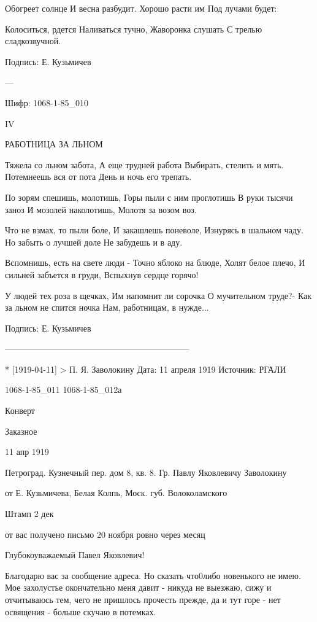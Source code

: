 Обогреет солнце
     И весна разбудит.
Хорошо расти им 
     Под лучами будет:

Колоситься, рдется
     Наливаться тучно,
Жаворонка слушать
     С трелью сладкозвучной.
     
Подпись: Е. Кузьмичев

---

Шифр:   1068-1-85_010

IV



РАБОТНИЦА ЗА ЛЬНОМ


Тяжела со льном забота,
А еще трудней работа
          Выбирать, стелить и мять.
Потемнеешь вся от пота
          День и ночь его трепать.

По зорям спешишь, молотишь,
Горы пыли с ним проглотишь
          В руки тысячи заноз
И мозолей наколотишь,
          Молотя за возом воз.

Что не взмах, то пыли боле,
И закашлешь поневоле,
          Изнурясь в шальном чаду.
Но забыть о лучшей доле
          Не забудешь и в аду.

Вспомнишь, есть на свете люди -   
Точно яблоко на блюде,
          Холят белое плечо,
И сильней забъется в груди,
          Вспыхнув сердце горячо!

У людей тех роза в щечках,
Им напомнит ли сорочка
          О мучительном труде?-
Как за льном не спится ночка
          Нам, работницам, в нужде...
          
Подпись: Е. Кузьмичев


-----------------------------------------------------------------

* [1919-04-11] > П. Я. Заволокину 
Дата: 11 апреля 1919
Источник: РГАЛИ

1068-1-85_011
1068-1-85_012а


Конверт

Заказное

11 апр 1919

Петроград. Кузнечный пер. дом 8, кв. 8.
Гр. Павлу Яковлевичу Заволокину

от Е. Кузьмичева,
Белая Колпь, Моск. губ. Волоколамского

Штамп 2 дек

от вас получено письмо 20 ноября ровно через месяц

Глубокоуважаемый Павел Яковлевич!

Благодарю вас за сообщение адреса. Но сказать что0либо новенького не имею. Мое захолустье окончательно меня давит - никуда не выезжаю, сижу и отчитываюсь тем, чего не пришлось прочесть прежде, да и тут горе - нет освящения - больше скучаю в потемках.

